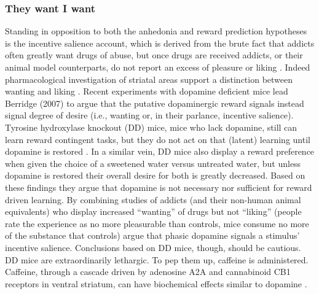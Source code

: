\documentclass[doc,12pt]{apa}        %
\begin{document}
\subsubsection{They want I want}
\label{subsub:salience}
Standing in opposition to both the anhedonia and reward prediction hypotheses is the incentive salience account, which is derived from the brute fact that addicts often greatly want drugs of abuse, but once drugs are received addicts, or their animal model counterparts, do not report an excess of pleasure or liking \cite{Robinson:1993p8987}.  Indeed pharmacological investigation of striatal areas support a distinction between wanting and liking \cite{Berridge:2003p8998}.  Recent experiments with dopamine deficient mice lead Berridge (2007) to argue that the putative dopaminergic reward signals instead signal degree of desire (i.e., wanting or, in their parlance, incentive salience).  Tyrosine hydroxylase knockout (DD) mice, mice who lack dopamine, still can learn reward contingent tasks, but they do not act on that (latent) learning until dopamine is restored \cite{Berridge:2007p7235}. In a similar vein, DD mice also display a reward preference when given the choice of a sweetened water versus untreated water, but unless dopamine is restored their overall desire for both is greatly decreased.  Based on these findings they argue that dopamine is not necessary nor sufficient for reward driven learning.  By combining studies of addicts (and their non-human animal equivalents) who display increased ``wanting'' of drugs but not ``liking'' (people rate the experience as no more pleasurable than controls, mice consume no more of the substance that controls)  argue that phasic dopamine signals a stimulus' incentive salience.  Conclusions based on DD mice, though, should be cautious.  DD mice are extraordinarily lethargic.  To pep them up, caffeine is administered.  Caffeine, through a cascade driven by adenosine A2A and cannabinoid CB1 receptors in ventral striatum, can have biochemical effects similar to dopamine \cite{Lazarus:2011p8137, Rossi:2010p7252}.
\end{document}
